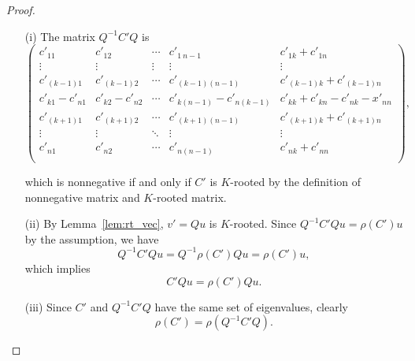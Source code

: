 \documentclass[12pt, a4paper]{article}
\theoremstyle{plain}
\theoremstyle{definition}
\newtheorem{rem}[thm]{Remark}
\begin{document}

\begin{proof}
\begin{enumerate}
  \item[(i)] The matrix $Q^{-1}C'Q$ is
        $$\begin{pmatrix}
            c'_{11}     & c'_{12} & \cdots     & c'_{1\ n-1} & c'_{1k}+c'_{1n} \\
            \vdots      & \vdots  & \vdots     & \vdots      & \vdots\\
            c'_{(k-1) 1}   & c'_{(k-1)  2}           & \cdots     & c'_{(k-1) (n-1)} & c'_{(k-1) k}+c'_{(k-1) n} \\
            c'_{k1}-c'_{n1} & c'_{k2}-c'_{n2} &\cdots      &c'_{k (n-1)}-c'_{n (k-1)}& c'_{kk}+c'_{kn}-c'_{nk}-x'_{nn}\\
            c'_{(k+1) 1}   & c'_{(k+1) 2}           & \cdots     & c'_{(k+1) (n-1)} & c'_{(k+1) k}+c'_{(k+1)
             n} \\
            \vdots              & \vdots & \ddots              & \vdots & \vdots \\
            c'_{n1}     & c'_{n2} & \cdots             & c'_{n (n-1)} & c'_{nk}+c'_{nn} \\
        \end{pmatrix},$$

        which is nonnegative if and only if $C'$ is $K$-rooted by the definition of nonnegative matrix and $K$-rooted matrix.
  \item[(ii)] By Lemma~\ref{lem:rt_vec}, $v'=Qu$ is $K$-rooted. Since $Q^{-1}C'Qu=\rho(C')u$ by the assumption, we have
      $$Q^{-1} C' Q u  = Q^{-1} \rho(C') Qu  =\rho(C')u,$$
      which implies
        $$C'Qu=\rho(C')Qu.$$
  \item[(iii)] Since $C'$ and $Q^{-1}C'Q$ have the same set of eigenvalues, clearly
  $$\rho(C') = \rho(Q^{-1}C'Q).$$
\end{enumerate}
\end{proof}
\end{document}
